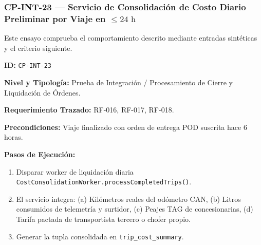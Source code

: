 \subsubsection*{CP-INT-23 — Servicio de Consolidación de Costo Diario Preliminar por Viaje en \(\le 24\text{ h}\)}\label{sec:9-cp-int-23}
Este ensayo comprueba el comportamiento descrito mediante entradas sintéticas y el criterio siguiente.

\par\noindent\textbf{ID:} \texttt{C\allowbreak{}P\allowbreak{}-\allowbreak{}I\allowbreak{}N\allowbreak{}T\allowbreak{}-\allowbreak{}2\allowbreak{}3\allowbreak{}}\par
\par\noindent\textbf{Nivel y Tipología:} Prueba de Integración / Procesamiento de Cierre y Liquidación de Órdenes.\par
\par\noindent\textbf{Requerimiento Trazado:} RF-016, RF-017, RF-018.\par
\par\noindent\textbf{Precondiciones:} Viaje finalizado con orden de entrega POD suscrita hace 6 horas.\par
\par\noindent\textbf{Pasos de Ejecución:} \par
\begin{enumerate}
\item Disparar worker de liquidación diaria \texttt{C\allowbreak{}o\allowbreak{}s\allowbreak{}t\allowbreak{}C\allowbreak{}o\allowbreak{}n\allowbreak{}s\allowbreak{}o\allowbreak{}l\allowbreak{}i\allowbreak{}d\allowbreak{}a\allowbreak{}t\allowbreak{}i\allowbreak{}o\allowbreak{}n\allowbreak{}W\allowbreak{}o\allowbreak{}r\allowbreak{}k\allowbreak{}e\allowbreak{}r\allowbreak{}.\allowbreak{}p\allowbreak{}r\allowbreak{}o\allowbreak{}c\allowbreak{}e\allowbreak{}s\allowbreak{}s\allowbreak{}C\allowbreak{}o\allowbreak{}m\allowbreak{}p\allowbreak{}l\allowbreak{}e\allowbreak{}t\allowbreak{}e\allowbreak{}d\allowbreak{}T\allowbreak{}r\allowbreak{}i\allowbreak{}p\allowbreak{}s\allowbreak{}(\allowbreak{})\allowbreak{}}.
\item El servicio integra: (a) Kilómetros reales del odómetro CAN, (b) Litros consumidos de telemetría y surtidor, (c) Peajes TAG de concesionarias, (d) Tarifa pactada de transportista tercero o chofer propio.
\item Generar la tupla consolidada en \texttt{t\allowbreak{}r\allowbreak{}i\allowbreak{}p\allowbreak{}\_\allowbreak{}c\allowbreak{}o\allowbreak{}s\allowbreak{}t\allowbreak{}\_\allowbreak{}s\allowbreak{}u\allowbreak{}m\allowbreak{}m\allowbreak{}a\allowbreak{}r\allowbreak{}y\allowbreak{}}.
\end{enumerate}
